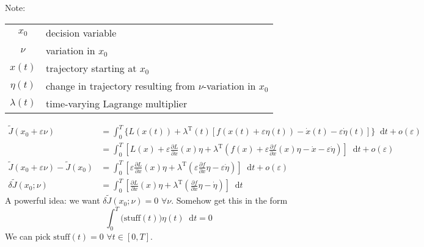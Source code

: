 \documentclass[letterpaper,12pt,titlepage]{report}
\newcommand*\dif{\mathop{}\!\mathrm{d}}
\newcommand{\trans}{^\text{T}}
\newcommand*\pder[2]{\frac{\partial #1}{\partial #2}}
\theoremstyle{plain}
\theoremstyle{definition}
\begin{document}
\begin{center}
\end{center}

Note:

\hspace{\parindent}
\begin{tabular}{cl}
  $x_0$ & decision variable \\
  $\nu$ & variation in $x_0$ \\
  $x(t)$ & trajectory starting at $x_0$ \\
  $\eta(t)$ & change in trajectory resulting from $\nu$-variation in $x_0$ \\
  $\lambda(t)$ & time-varying Lagrange multiplier
\end{tabular}

\begin{align}
  \tilde J(x_0+\varepsilon \nu) &= \int_0^T \Big\{ L(x(t)) + \lambda\trans(t) [f(x(t)+\varepsilon\eta(t)) - \dot x(t) - \varepsilon\dot\eta(t)] \Big\} \dif t + o(\varepsilon) \\
                                &= \int_0^T \left[ L(x) + \varepsilon\pder{L}{x}(x)\eta + \lambda\trans \left( f(x) + \varepsilon\pder{f}{x}(x)\eta - \dot x - \varepsilon\dot\eta \right) \right] \dif t + o(\varepsilon) \\
  \tilde J(x_0+\varepsilon \nu) - \tilde J(x_0) &= \int_0^T \left[ \varepsilon\pder{L}{x}(x)\eta + \lambda\trans\left( \varepsilon\pder{f}{x}\eta - \varepsilon\dot\eta \right) \right] \dif t + o(\varepsilon) \\
  \delta \tilde J (x_0;\nu) &= \int_0^T \left[ \pder{L}{x}(x)\eta + \lambda\trans\left( \pder{f}{x}\eta - \dot\eta \right) \right] \dif t
\end{align}
A powerful idea: we want $\delta\tilde J(x_0;\nu)=0$ $\forall \nu$. Somehow get this in the form
\[ \int_0^T \Big(\text{stuff}(t)\Big) \eta(t) \dif t = 0 \]
We can pick $\text{stuff}(t)=0$ $\forall t\in[0,T]$.
\end{document}
